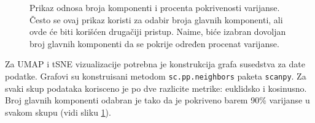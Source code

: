 \documentclass{article}
\begin{document}
\begin{figure}[H]
    \centering
    \caption{ Prikaz odnosa broja komponenti i procenta pokrivenosti varijanse. Često se ovaj prikaz koristi za odabir broja glavnih komponenti, ali ovde će biti korišćen drugačiji pristup. Naime, biće izabran dovoljan broj glavnih komponenti da se pokrije određen procenat varijanse. }
    \label{fig:variance_ratios}
\end{figure}

Za UMAP i tSNE vizualizacije potrebna je konstrukcija grafa susedstva za date podatke. Grafovi su konstruisani metodom \lstinline{sc.pp.neighbors} paketa \lstinline{scanpy}. Za svaki skup podataka korisceno je po dve razlicite metrike: euklidsko i kosinusno. Broj glavnih komponenti odabran je tako da je pokriveno barem 90\% varijanse u svakom skupu (vidi sliku \ref{fig:variance_ratios}).
\end{document}
